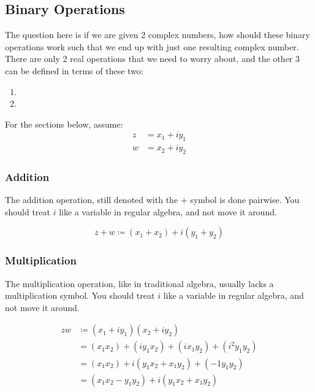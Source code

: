 \subsection{Binary Operations}\label{subsec:Binary_Operations}
The question here is if we are given 2 complex numbers, how should these binary operations work such that we end up with just one resulting complex number.
There are only 2 real operations that we need to worry about, and the other 3 can be defined in terms of these two:
\begin{enumerate}[noitemsep]
\item {}
\item {}
\end{enumerate}

For the sections below, assume:
\begin{align*}
  z &= x_{1} + iy_{1} \\
  w &= x_{2} + iy_{2}
\end{align*}

\subsubsection{Addition}\label{subsubsec:Complex_Number-Addition}
The addition operation, still denoted with the $+$ symbol is done pairwise.
You should treat $i$ like a variable in regular algebra, and not move it around.

\begin{equation}\label{eq:Complex_Number-Addition}
  z+w \coloneqq (x_{1}+x_{2}) + i(y_{1}+y_{2})
\end{equation}

\subsubsection{Multiplication}\label{subsubsec:Complex_Number-Multiplication}
The multiplication operation, like in traditional algebra, usually lacks a multiplication symbol.
You should treat $i$ like a variable in regular algebra, and not move it around.

\begin{equation}\label{eq:Complex_Number-Addition}
  \begin{aligned}
    zw &\coloneqq (x_{1} + iy_{1}) (x_{2} + iy_{2}) \\
    &= (x_{1}x_{2}) + (iy_{1}x_{2}) + (ix_{1}y_{2}) + (i^{2}y_{1}y_{2}) \\
    &= (x_{1}x_{2}) + i(y_{1}x_{2} + x_{1}y_{2}) + (-1 y_{1}y_{2}) \\
    &= (x_{1}x_{2} - y_{1}y_{2}) + i(y_{1}x_{2} + x_{1}y_{2}) \\
  \end{aligned}
\end{equation}


